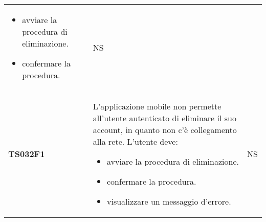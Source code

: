 \documentclass[../piano-di-qualifica.tex]{subfiles}
\begin{document}
\begin{centering}
\begin{longtable}[H]{>{\centering\bfseries}m{3cm} >{}p{10cm} >{\centering\arraybackslash}m{3cm}}
                      \begin{itemize}
                        \item avviare la procedura di eliminazione.
                        \item confermare la procedura.
                      \end{itemize}
                    & NS \\
        TS032F1     & L'applicazione mobile non permette all'utente autenticato di eliminare il suo account, in quanto non c'è collegamento alla rete. \newline
                      L'utente deve:
                      \begin{itemize}
                        \item avviare la procedura di eliminazione.
                        \item confermare la procedura.
                        \item visualizzare un messaggio d'errore.
                      \end{itemize}
                    & NS \\



\end{longtable}
\end{centering}
\end{document}
